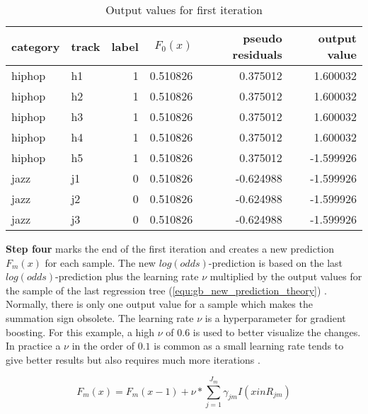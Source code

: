 \begin{table}[H]
    \centering
    \begin{tabular}{llrrrr}
        \toprule
        category & track &  label &  \(F_{0}(x)\) &  pseudo residuals &  output value \\
        \midrule
          hiphop &    h1 &      1 & 0.510826 &            0.375012 &        1.600032 \\
          hiphop &    h2 &      1 & 0.510826 &            0.375012 &        1.600032 \\
          hiphop &    h3 &      1 & 0.510826 &            0.375012 &        1.600032 \\
          hiphop &    h4 &      1 & 0.510826 &            0.375012 &        1.600032 \\
          hiphop &    h5 &      1 & 0.510826 &            0.375012 &       -1.599926 \\
            jazz &    j1 &      0 & 0.510826 &           -0.624988 &       -1.599926 \\
            jazz &    j2 &      0 & 0.510826 &           -0.624988 &       -1.599926 \\
            jazz &    j3 &      0 & 0.510826 &           -0.624988 &       -1.599926 \\
        \bottomrule
        \end{tabular}
    \caption{Output values for first iteration}%
    \label{tbl:theory_output_values_1_iteration}%
  \end{table} 

\textbf{Step four} marks the end of the first iteration and creates a new prediction \(F_{m}(x)\) for each sample. 
The new \(log(odds)\)-prediction is based on the last \(log(odds)\)-prediction plus the learning rate \(\nu\) multiplied by 
the output values for the sample of the last regression tree (\ref{equ:gb_new_prediction_theory}) \cite[p.1203]{Friedman_2001}. Normally, there is only one 
output value for a sample which makes the summation sign obsolete. The learning rate \(\nu\) is a 
hyperparameter for gradient boosting. For this example, a high \(\nu\) of \(0.6\) is used to better visualize 
the changes. In practice a \(\nu \) in the order of \(0.1\) is common as a small learning rate tends to
give better results but also requires much more iterations \cite[p.1206]{Friedman_2001}. 

\begin{equation}
    F_{m}(x) = F_{m}(x- 1) + \nu * \sum_{j = 1}^{J_{m}} \gamma_{jm}I(x in R_{jm})
    \label{equ:gb_new_prediction_theory}
\end{equation}

